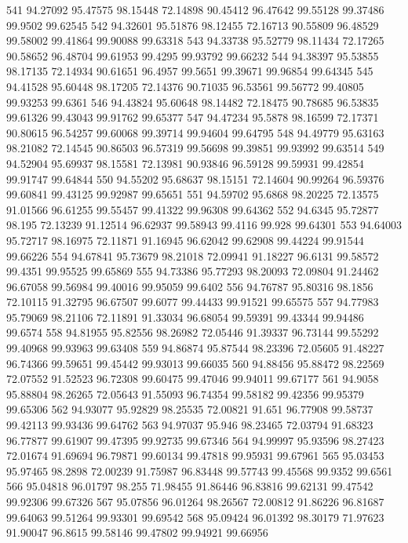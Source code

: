 541	94.27092	95.47575	98.15448	72.14898	90.45412	96.47642	99.55128	99.37486	99.9502	99.62545
542	94.32601	95.51876	98.12455	72.16713	90.55809	96.48529	99.58002	99.41864	99.90088	99.63318
543	94.33738	95.52779	98.11434	72.17265	90.58652	96.48704	99.61953	99.4295	99.93792	99.66232
544	94.38397	95.53855	98.17135	72.14934	90.61651	96.4957	99.5651	99.39671	99.96854	99.64345
545	94.41528	95.60448	98.17205	72.14376	90.71035	96.53561	99.56772	99.40805	99.93253	99.6361
546	94.43824	95.60648	98.14482	72.18475	90.78685	96.53835	99.61326	99.43043	99.91762	99.65377
547	94.47234	95.5878	98.16599	72.17371	90.80615	96.54257	99.60068	99.39714	99.94604	99.64795
548	94.49779	95.63163	98.21082	72.14545	90.86503	96.57319	99.56698	99.39851	99.93992	99.63514
549	94.52904	95.69937	98.15581	72.13981	90.93846	96.59128	99.59931	99.42854	99.91747	99.64844
550	94.55202	95.68637	98.15151	72.14604	90.99264	96.59376	99.60841	99.43125	99.92987	99.65651
551	94.59702	95.6868	98.20225	72.13575	91.01566	96.61255	99.55457	99.41322	99.96308	99.64362
552	94.6345	95.72877	98.195	72.13239	91.12514	96.62937	99.58943	99.4116	99.928	99.64301
553	94.64003	95.72717	98.16975	72.11871	91.16945	96.62042	99.62908	99.44224	99.91544	99.66226
554	94.67841	95.73679	98.21018	72.09941	91.18227	96.6131	99.58572	99.4351	99.95525	99.65869
555	94.73386	95.77293	98.20093	72.09804	91.24462	96.67058	99.56984	99.40016	99.95059	99.6402
556	94.76787	95.80316	98.1856	72.10115	91.32795	96.67507	99.6077	99.44433	99.91521	99.65575
557	94.77983	95.79069	98.21106	72.11891	91.33034	96.68054	99.59391	99.43344	99.94486	99.6574
558	94.81955	95.82556	98.26982	72.05446	91.39337	96.73144	99.55292	99.40968	99.93963	99.63408
559	94.86874	95.87544	98.23396	72.05605	91.48227	96.74366	99.59651	99.45442	99.93013	99.66035
560	94.88456	95.88472	98.22569	72.07552	91.52523	96.72308	99.60475	99.47046	99.94011	99.67177
561	94.9058	95.88804	98.26265	72.05643	91.55093	96.74354	99.58182	99.42356	99.95379	99.65306
562	94.93077	95.92829	98.25535	72.00821	91.651	96.77908	99.58737	99.42113	99.93436	99.64762
563	94.97037	95.946	98.23465	72.03794	91.68323	96.77877	99.61907	99.47395	99.92735	99.67346
564	94.99997	95.93596	98.27423	72.01674	91.69694	96.79871	99.60134	99.47818	99.95931	99.67961
565	95.03453	95.97465	98.2898	72.00239	91.75987	96.83448	99.57743	99.45568	99.9352	99.6561
566	95.04818	96.01797	98.255	71.98455	91.86446	96.83816	99.62131	99.47542	99.92306	99.67326
567	95.07856	96.01264	98.26567	72.00812	91.86226	96.81687	99.64063	99.51264	99.93301	99.69542
568	95.09424	96.01392	98.30179	71.97623	91.90047	96.8615	99.58146	99.47802	99.94921	99.66956
